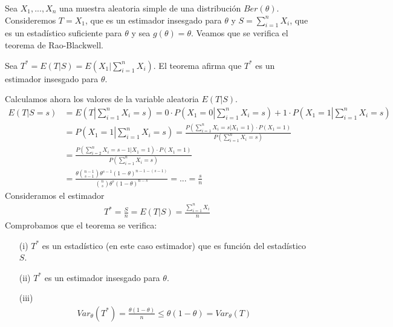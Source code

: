 \begin{ejemplo}
    Sea $X_1,...,X_n$ una muestra aleatoria simple de una distribución $Ber(\theta)$. Consideremos $T = X_1$, que es un estimador insesgado para $\theta$ y $S = \sum_{i=1}^{n}{X_i}$, que es un estadístico suficiente para $\theta$ y sea $g(\theta) = \theta$. Veamos que se verifica el teorema de Rao-Blackwell.

    Sea $T^* = E(T | S) = E\left(X_1 | \sum_{i=1}^{n}{X_i}\right)$. El teorema afirma que $T^*$ es un estimador insesgado para $\theta$.

    Calculamos ahora los valores de la variable aleatoria $E(T | S)$.
    \begin{align*}
        E\left(T | S = s \right) & = E\left(T \left|  \sum_{i=1}^{n}{X_i} = s \right.\right)
        = 0 \cdot P\left(X_1 = 0 \left|  \sum_{i=1}^{n}{X_i} = s \right.\right) + 1 \cdot P\left(X_1 = 1 \left|  \sum_{i=1}^{n}{X_i} = s \right.\right)                                                                            \\
                                 & = P\left(X_1 = 1 \left|  \sum_{i=1}^{n}{X_i} = s \right.\right) = \frac{P\left(\sum_{i=1}^{n}{X_i} = s  \left|  X_1 = 1 \right.\right) \cdot P(X_1 = 1)}{P\left(\sum_{i=1}^{n}{X_i} = s\right)} \\
                                 & = \frac{P\left(\sum_{i=2}^{n}{X_i} = s - 1  \left|  X_1 = 1 \right.\right) \cdot P(X_1 = 1)}{P\left(\sum_{i=1}^{n}{X_i} = s\right)}                                                             \\
                                 & = \frac{\theta \binom{n-1}{s-1}\theta^{s-1}(1 - \theta)^{n-1-(s-1)}}{\binom{n}{s}\theta^s(1-\theta)^{n-s}} = ... = \frac{s}{n}
    \end{align*}
    Consideramos el estimador
    \begin{align*}
        T^* = \frac{S}{n} = E(T | S) = \frac{\sum_{i=1}^{n}{X_i}}{n}
    \end{align*}
    Comprobamos que el teorema se verifica:
    \begin{enumerate}
        \item[(i)] $T^*$ es un estadístico (en este caso estimador) que es función del estadístico $S$.
        \item[(ii)] $T^*$ es un estimador insesgado para $\theta$.
        \item[(iii)]
              \begin{align*}
                  Var_{\theta}(T^*) = \frac{\theta (1 - \theta)}{n} \leq \theta (1 - \theta) = Var_{\theta}(T)
              \end{align*}
    \end{enumerate}
\end{ejemplo}

